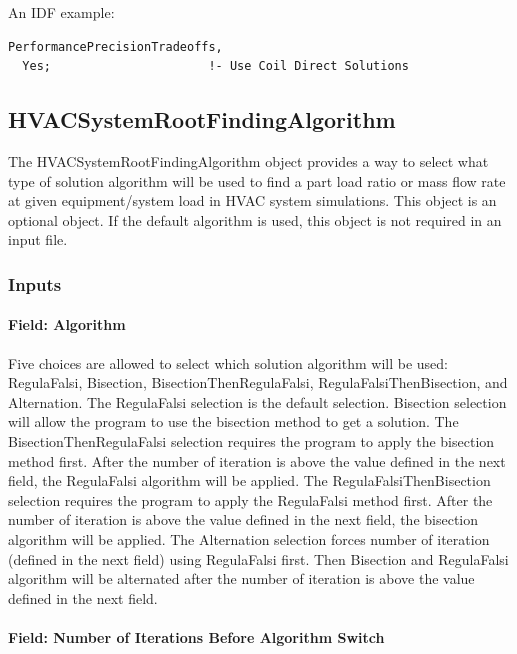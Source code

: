 An IDF example:

\begin{lstlisting}
PerformancePrecisionTradeoffs,
  Yes;                      !- Use Coil Direct Solutions
\end{lstlisting}

\subsection{HVACSystemRootFindingAlgorithm}\label{hvacystemrootfindingalgorithm}

The HVACSystemRootFindingAlgorithm object provides a way to select what type of solution
algorithm will be used to find a part load ratio or mass flow rate at given equipment/system load in HVAC system simulations. This object is an optional object. If the default algorithm is used, this object is not required in an input file.


\subsubsection{Inputs}\label{inputs-hvacystemrootfindingalgorithm}

\paragraph{Field: Algorithm}\label{field-algorithm-201710020807}

Five choices are allowed to select which solution algorithm will be used: RegulaFalsi, Bisection,  BisectionThenRegulaFalsi, RegulaFalsiThenBisection, and Alternation. The RegulaFalsi
selection is the default selection. Bisection selection will allow the program to use the bisection method to get a solution. The BisectionThenRegulaFalsi selection requires the program to apply the bisection method first. After the number of iteration is above the value defined in the next field, the RegulaFalsi algorithm will be applied. The RegulaFalsiThenBisection selection requires the program to apply the RegulaFalsi method first. After the number of iteration is above the value defined in the next field, the bisection algorithm will be applied. The Alternation selection forces number of iteration (defined in the next field) using RegulaFalsi first. Then Bisection and RegulaFalsi algorithm will be alternated after the number of iteration is above the value defined in the next field.


\paragraph{Field: Number of Iterations Before Algorithm Switch}\label{field-number-of-iteration-before-algorithm-switch}

